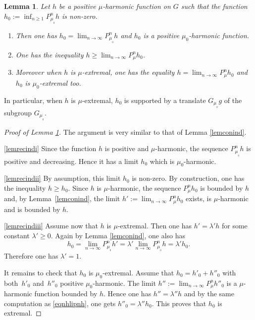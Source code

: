 \documentclass[11pt]{article}
\numberwithin{equation}{section}
\newenvironment{enumeratei}
{\bgroup\def\theenumi{\roman{enumi}}\def\theenumii{\arabic{enumii}}\begin{enumerate}}
{\end{enumerate}\egroup}
\newtheorem{Lem}[Thm]{Lemma}
\theoremstyle{definition}
\let\la\lambda
\let\ra\to
\begin{document}
\begin{Lem}
\label{lemrecind}
Let $h$ be a positive $\mu$-harmonic function on $G$ such that
the function $h_0:=\inf_{n\geq 1}P^n_{\mu_{_0}}h$ is non-zero.
\begin{enumeratei}
\item\label{lemrecindi}
Then
one has
$h_0=\lim_{n\ra\infty}P^n_{\mu_{_0}}h$ and
$h_0$ is a positive $\mu_0$-harmonic function.
\item\label{lemrecindii}
One has the inequality
$h\geq\lim_{n\ra\infty}P^n_{\mu}h_0$.
\item\label{lemrecindiii}
Moreover when $h$ is $\mu$-extremal, one has the equality
$h=\lim_{n\ra\infty}P^n_{\mu}h_0$ and~$h_0$ is $\mu_0$-extremal too.
\end{enumeratei}
\end{Lem}

In particular, when $h$ is $\mu$-extremal, $h_0$ is supported by a translate
$G_{\mu_{_0}}g$ of the subgroup $G_{\mu_{_0}}$.

\begin{proof}[Proof of Lemma \ref{lemrecind}]
The argument is very similar to that of Lemma \ref{lemconind}.

\eqref{lemrecindi}
Since the function $h$ is positive and $\mu$-harmonic, the sequence
$P^n_{\mu_{_0}}h$ is positive and decreasing. Hence it has a limit $h_0$
which is $\mu_0$-harmonic.

\eqref{lemrecindii}
By assumption, this limit $h_0$ is non-zero. By construction,
one has the inequality
$h\geq h_0$. Since $h$ is $\mu$-harmonic, the sequence
$ P^n_{\mu}h_0$ is bounded by $h$ and, by Lemma~\ref{lemconind},
the limit $h':=\lim_{n\ra\infty}P^n_\mu h_0$
exists, is $\mu$-harmonic and is bounded by $h$.

\eqref{lemrecindiii}
Assume now that $h$ is $\mu$-extremal.
Then one has $h'=\la' h$ for some constant $\la'\geq 0$.
Again by Lemma \ref{lemconind}, one also has
\begin{equation}
\label{eqnhlipnh}
h_0=\lim_{n\ra\infty}P^n_{\mu_{_0}}h'
=\la'\lim_{n\ra\infty}P^n_{\mu_{_0}}h=\la' h_0.
\end{equation}
Therefore one has $\la'=1$.

It remains to check that $h_0$ is $\mu_0$-extremal.
Assume that $h_0=h'_0+h''_0$ with both~$h'_0$ and~$h''_0$
positive $\mu_0$-harmonic.
The limit
$h'':=\lim_{n\ra\infty}P^n_{\mu}h''_0$
is a $\mu$-harmonic function bounded by $h$.
Hence one has $h''=\la'' h$
and by the same computation as \eqref{eqnhlipnh}, one gets
$h''_0=\la'' h_0$.
This proves that $h_0$ is extremal.
\end{proof}
\end{document}
